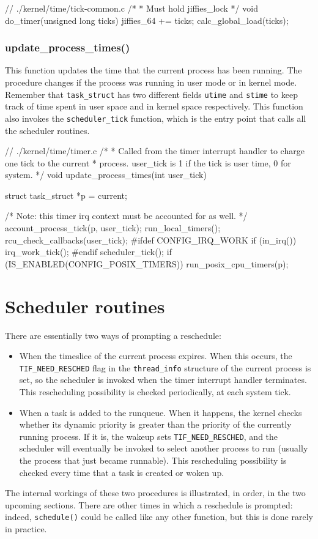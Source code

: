 \begin{code}
// ./kernel/time/tick-common.c
/*
 * Must hold jiffies_lock
 */
void do_timer(unsigned long ticks)
{
	jiffies_64 += ticks;
	calc_global_load(ticks);
}
\end{code}

\subsubsection{update\_process\_times()}
This function updates the time that the current process has been running. The procedure changes if the process was running in user mode or in kernel mode. Remember that \verb|task_struct| has two different fields \verb|utime| and \verb|stime| to keep track of time spent in user space and in kernel space respectively. This function also invokes the \verb|scheduler_tick| function, which is the entry point that calls all the scheduler routines.

\begin{code}
// ./kernel/time/timer.c
/*
 * Called from the timer interrupt handler to charge one tick to the current
 * process.  user_tick is 1 if the tick is user time, 0 for system.
 */
void update_process_times(int user_tick)
{
	struct task_struct *p = current;

	/* Note: this timer irq context must be accounted for as well. */
	account_process_tick(p, user_tick);
	run_local_timers();
	rcu_check_callbacks(user_tick);
#ifdef CONFIG_IRQ_WORK
	if (in_irq())
		irq_work_tick();
#endif
	scheduler_tick();
	if (IS_ENABLED(CONFIG_POSIX_TIMERS))
		run_posix_cpu_timers(p);
}
\end{code}

\section{Scheduler routines}
There are essentially two ways of prompting a reschedule:
\begin{itemize}
    \item When the timeslice of the current process expires. When this occurs, the \verb|TIF_NEED_RESCHED|
    flag in the \verb|thread_info| structure of the current process is set, so the scheduler is
    invoked when the timer interrupt handler terminates.\cite{cesati} This rescheduling possibility is checked periodically, at each system tick.
    \item When a task is added to the runqueue. When it happens, the kernel checks whether its dynamic priority is greater than the priority of the currently running process. If it is, the wakeup sets \verb|TIF_NEED_RESCHED|, and the scheduler will eventually be invoked to select another process to run
    (usually the process that just became runnable).\cite{cesati} This rescheduling possibility is checked every time that a task is created or woken up.
\end{itemize}
The internal workings of these two procedures is illustrated, in order, in the two upcoming sections. There are other times in which a reschedule is prompted: indeed, \verb|schedule()| could be called like any other function, but this is done rarely in practice.

